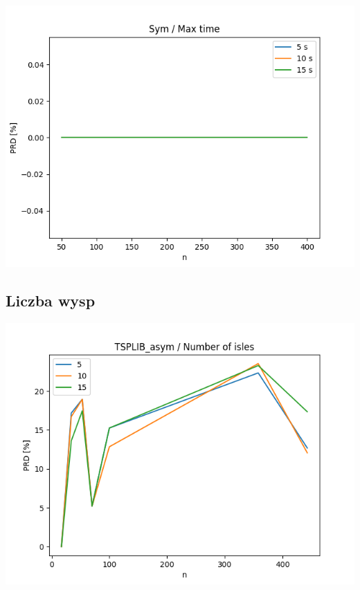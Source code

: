 \documentclass{article}
\begin{document}
\begin{center}
\includegraphics[width=\textwidth, 
                   height = 0.4\textheight, 
                   keepaspectratio]
                  {plots/sym_9_max_time} 
\end{center}


\subsection{Liczba wysp}

\begin{center}
\includegraphics[width=\textwidth, 
                   height = 0.4\textheight, 
                   keepaspectratio]
                  {plots/tsplib_asym_10_isles} 
\end{center}
\end{document}
